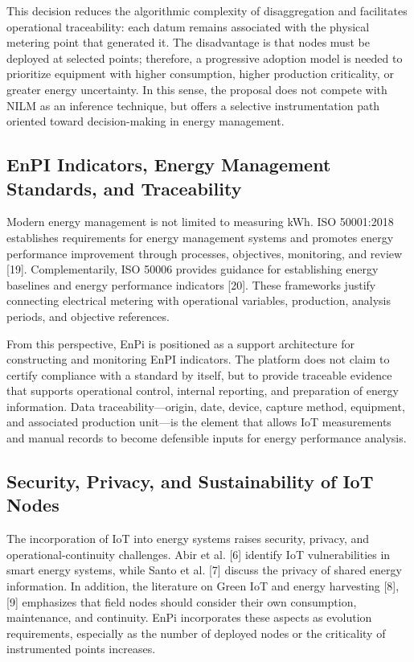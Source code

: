 \documentclass{ieeeaccess}
\begin{document}
This decision reduces the algorithmic complexity of disaggregation and facilitates operational traceability: each datum remains associated with the physical metering point that generated it. The disadvantage is that nodes must be deployed at selected points; therefore, a progressive adoption model is needed to prioritize equipment with higher consumption, higher production criticality, or greater energy uncertainty. In this sense, the proposal does not compete with NILM as an inference technique, but offers a selective instrumentation path oriented toward decision-making in energy management.

\subsection{EnPI Indicators, Energy Management Standards, and Traceability}
\label{subsec:enpi-standards}

Modern energy management is not limited to measuring kWh. ISO 50001:2018 establishes requirements for energy management systems and promotes energy performance improvement through processes, objectives, monitoring, and review [19]. Complementarily, ISO 50006 provides guidance for establishing energy baselines and energy performance indicators [20]. These frameworks justify connecting electrical metering with operational variables, production, analysis periods, and objective references.

From this perspective, EnPi is positioned as a support architecture for constructing and monitoring EnPI indicators. The platform does not claim to certify compliance with a standard by itself, but to provide traceable evidence that supports operational control, internal reporting, and preparation of energy information. Data traceability---origin, date, device, capture method, equipment, and associated production unit---is the element that allows IoT measurements and manual records to become defensible inputs for energy performance analysis.

\subsection{Security, Privacy, and Sustainability of IoT Nodes}
\label{subsec:security-privacy}

The incorporation of IoT into energy systems raises security, privacy, and operational-continuity challenges. Abir et al. [6] identify IoT vulnerabilities in smart energy systems, while Santo et al. [7] discuss the privacy of shared energy information. In addition, the literature on Green IoT and energy harvesting [8], [9] emphasizes that field nodes should consider their own consumption, maintenance, and continuity. EnPi incorporates these aspects as evolution requirements, especially as the number of deployed nodes or the criticality of instrumented points increases.
\end{document}
